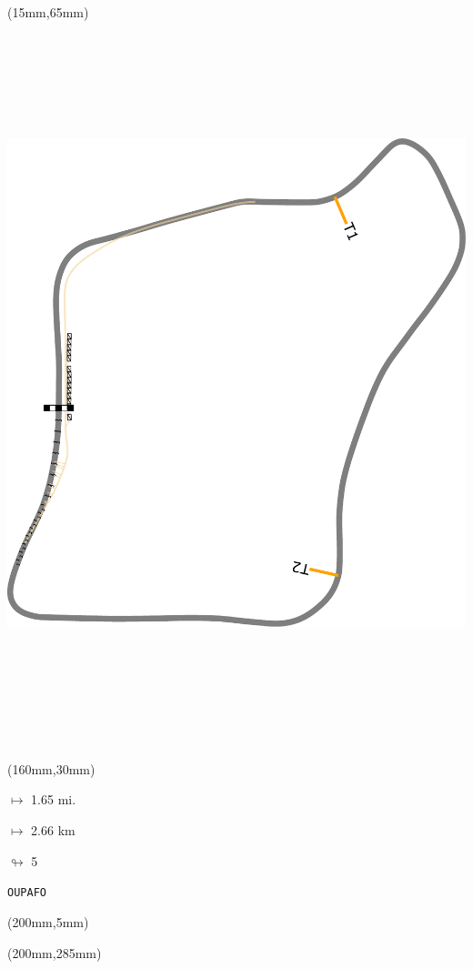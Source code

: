 \begin{textblock*}{185mm}(15mm,65mm)%
\centering
\mbox{\includegraphics[width=185mm,height=210mm,keepaspectratio]{PT/OUPAFO.pdf}}
\end{textblock*}
\begin{textblock*}{40mm}(160mm,30mm)%
\Large
\par$\mapsto$ 1.65 mi.
\par$\mapsto$ 2.66 km
\par$\looparrowright$ 5
\par\hfill\tiny\tt OUPAFO\\
\end{textblock*}
\begin{textblock*}{20mm}(200mm,5mm)%
\fbox{\thepage}
\label{OUPAFO}
\end{textblock*}
\begin{textblock*}{20mm}(200mm,285mm)%
\fbox{\thepage}
\end{textblock*}

